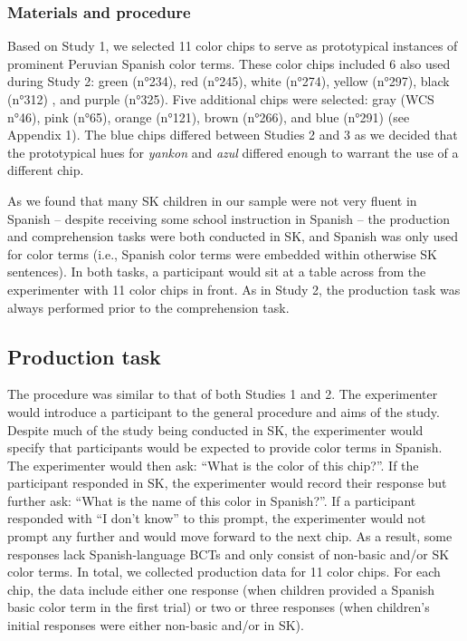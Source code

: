 \documentclass[
  english,
  ,man,floatsintext]{apa6}
\begin{document}
\hypertarget{materials-and-procedure-2}{%
\subsubsection{Materials and procedure}\label{materials-and-procedure-2}}

Based on Study 1, we selected 11 color chips to serve as prototypical instances of prominent Peruvian Spanish color terms. These color chips included 6 also used during Study 2: green (n°234), red (n°245), white (n°274), yellow (n°297), black (n°312) , and purple (n°325). Five additional chips were selected: gray (WCS n°46), pink (n°65), orange (n°121), brown (n°266), and blue (n°291) (see Appendix 1). The blue chips differed between Studies 2 and 3 as we decided that the prototypical hues for \emph{yankon} and \emph{azul} differed enough to warrant the use of a different chip.

As we found that many SK children in our sample were not very fluent in Spanish -- despite receiving some school instruction in Spanish -- the production and comprehension tasks were both conducted in SK, and Spanish was only used for color terms (i.e., Spanish color terms were embedded within otherwise SK sentences). In both tasks, a participant would sit at a table across from the experimenter with 11 color chips in front. As in Study 2, the production task was always performed prior to the comprehension task.

\hypertarget{production-task-1}{%
\subsection{Production task}\label{production-task-1}}

The procedure was similar to that of both Studies 1 and 2. The experimenter would introduce a participant to the general procedure and aims of the study. Despite much of the study being conducted in SK, the experimenter would specify that participants would be expected to provide color terms in Spanish. The experimenter would then ask: \enquote{What is the color of this chip?}. If the participant responded in SK, the experimenter would record their response but further ask: \enquote{What is the name of this color in Spanish?}. If a participant responded with \enquote{I don't know} to this prompt, the experimenter would not prompt any further and would move forward to the next chip. As a result, some responses lack Spanish-language BCTs and only consist of non-basic and/or SK color terms. In total, we collected production data for 11 color chips. For each chip, the data include either one response (when children provided a Spanish basic color term in the first trial) or two or three responses (when children's initial responses were either non-basic and/or in SK).
\end{document}
